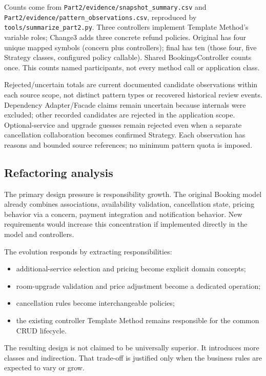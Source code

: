 \documentclass[10pt,a4paper]{article}
\newcommand{\code}[1]{\texttt{\small #1}}
\begin{document}
Counts come from \code{Part2/evidence/snapshot\_summary.csv} and \code{Part2/evidence/pattern\_observations.csv}, reproduced by \code{tools/summarize\_part2.py}. Three controllers implement Template Method's variable roles; Change3 adds three concrete refund policies. Original has four unique mapped symbols (concern plus controllers); final has ten (those four, five Strategy classes, configured policy callable). Shared BookingsController counts once. This counts named participants, not every method call or application class.

Rejected/uncertain totals are current documented candidate observations within each source scope, not distinct pattern types or recovered historical review events. Dependency Adapter/Facade claims remain uncertain because internals were excluded; other recorded candidates are rejected in the application scope. Optional-service and upgrade guesses remain rejected even when a separate cancellation collaboration becomes confirmed Strategy. Each observation has reasons and bounded source references; no minimum pattern quota is imposed.

\subsection{Refactoring analysis}

The primary design pressure is responsibility growth. The original Booking model already combines associations, availability validation, cancellation state, pricing behavior via a concern, payment integration and notification behavior. New requirements would increase this concentration if implemented directly in the model and controllers.

The evolution responds by extracting responsibilities:

\begin{itemize}[leftmargin=*]
\item additional-service selection and pricing become explicit domain concepts;
\item room-upgrade validation and price adjustment become a dedicated operation;
\item cancellation rules become interchangeable policies;
\item the existing controller Template Method remains responsible for the common CRUD lifecycle.
\end{itemize}

The resulting design is not claimed to be universally superior. It introduces more classes and indirection. That trade-off is justified only when the business rules are expected to vary or grow.
\end{document}
